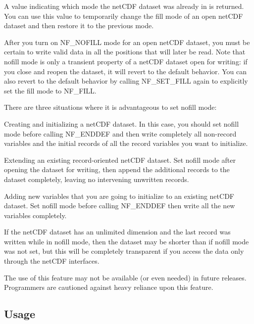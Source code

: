 A value indicating which mode the net\+C\+DF dataset was already in is returned. You can use this value to temporarily change the fill mode of an open net\+C\+DF dataset and then restore it to the previous mode.

After you turn on N\+F\+\_\+\+N\+O\+F\+I\+LL mode for an open net\+C\+DF dataset, you must be certain to write valid data in all the positions that will later be read. Note that nofill mode is only a transient property of a net\+C\+DF dataset open for writing\+: if you close and reopen the dataset, it will revert to the default behavior. You can also revert to the default behavior by calling N\+F\+\_\+\+S\+E\+T\+\_\+\+F\+I\+LL again to explicitly set the fill mode to N\+F\+\_\+\+F\+I\+LL.

There are three situations where it is advantageous to set nofill mode\+:


\begin{DoxyEnumerate}
\item Creating and initializing a net\+C\+DF dataset. In this case, you should set nofill mode before calling N\+F\+\_\+\+E\+N\+D\+D\+EF and then write completely all non-\/record variables and the initial records of all the record variables you want to initialize.
\item Extending an existing record-\/oriented net\+C\+DF dataset. Set nofill mode after opening the dataset for writing, then append the additional records to the dataset completely, leaving no intervening unwritten records.
\item Adding new variables that you are going to initialize to an existing net\+C\+DF dataset. Set nofill mode before calling N\+F\+\_\+\+E\+N\+D\+D\+EF then write all the new variables completely.
\end{DoxyEnumerate}

If the net\+C\+DF dataset has an unlimited dimension and the last record was written while in nofill mode, then the dataset may be shorter than if nofill mode was not set, but this will be completely transparent if you access the data only through the net\+C\+DF interfaces.

The use of this feature may not be available (or even needed) in future releases. Programmers are cautioned against heavy reliance upon this feature.

\subsection*{Usage }

